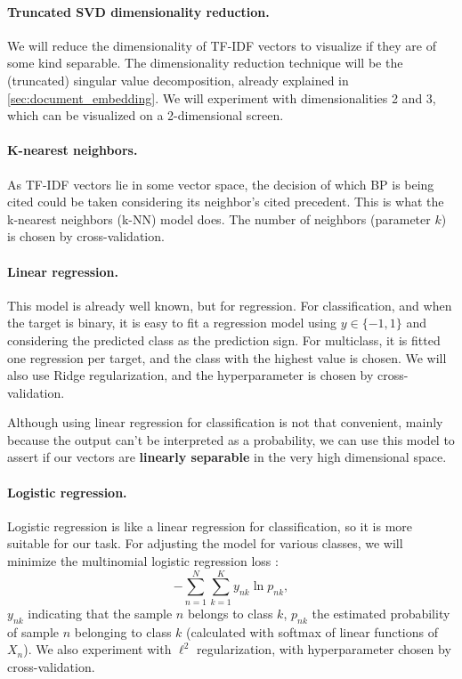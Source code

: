     \paragraph{Truncated SVD dimensionality reduction.} We will reduce the dimensionality of TF-IDF vectors to visualize if they are of some kind separable. The dimensionality reduction technique will be the (truncated) singular value decomposition, already explained in \autoref{sec:document_embedding}. We will experiment with dimensionalities 2 and 3, which can be visualized on a 2-dimensional screen.

    \paragraph{K-nearest neighbors.} As TF-IDF vectors lie in some vector space, the decision of which BP is being cited could be taken considering its neighbor's cited precedent. This is what the k-nearest neighbors (k-NN) model does. The number of neighbors (parameter $k$) is chosen by cross-validation.

    \paragraph{Linear regression.} This model is already well known, but for regression. For classification, and when the target is binary, it is easy to fit a regression model using $y \in \{-1, 1\}$ and considering the predicted class as the prediction sign. For multiclass, it is fitted one regression per target, and the class with the highest value is chosen. We will also use Ridge regularization, and the hyperparameter is chosen by cross-validation.

    Although using linear regression for classification is not that convenient, mainly because the output can't be interpreted as a probability, we can use this model to assert if our vectors are \textbf{linearly separable} in the very high dimensional space.

    \paragraph{Logistic regression.} Logistic regression is like a linear regression for classification, so it is more suitable for our task. For adjusting the model for various classes, we will minimize the multinomial logistic regression loss \cite{bishop2006pattern}:
    \[- \sum_{n=1}^N \sum_{k=1}^K y_{nk} \ln p_{nk},\]                  
    $y_{nk}$ indicating that the sample $n$ belongs to class $k$, $p_{nk}$ the estimated probability of sample $n$ belonging to class $k$ (calculated with softmax of linear functions of $X_n$). We also experiment with $\ell^2$ regularization, with hyperparameter chosen by cross-validation.

